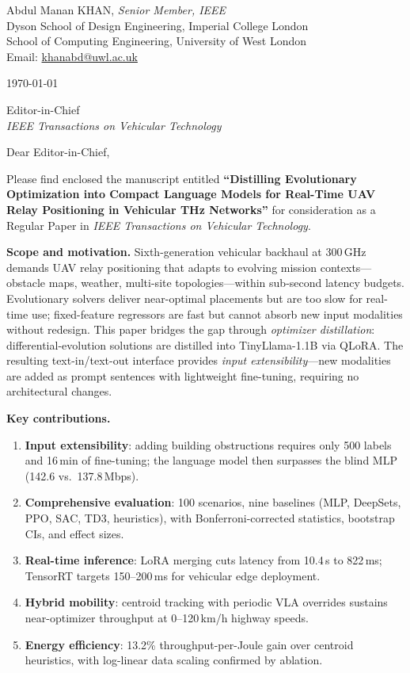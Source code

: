 \documentclass[11pt]{article}
\begin{document}
\noindent
Abdul Manan KHAN, \textit{Senior Member, IEEE}\\
Dyson School of Design Engineering, Imperial College London\\
School of Computing Engineering, University of West London\\
Email: \href{mailto:khanabd@uwl.ac.uk}{khanabd@uwl.ac.uk}

\bigskip
\noindent
\today

\bigskip
\noindent
Editor-in-Chief\\
\textit{IEEE Transactions on Vehicular Technology}

\bigskip
\noindent
Dear Editor-in-Chief,

\medskip
\noindent
Please find enclosed the manuscript entitled \textbf{``Distilling Evolutionary Optimization into Compact Language Models for Real-Time UAV Relay Positioning in Vehicular THz Networks''} for consideration as a Regular Paper in \textit{IEEE Transactions on Vehicular Technology}.

\medskip
\noindent\textbf{Scope and motivation.}
Sixth-generation vehicular backhaul at 300\,GHz demands UAV relay positioning that adapts to evolving mission contexts---obstacle maps, weather, multi-site topologies---within sub-second latency budgets. Evolutionary solvers deliver near-optimal placements but are too slow for real-time use; fixed-feature regressors are fast but cannot absorb new input modalities without redesign. This paper bridges the gap through \emph{optimizer distillation}: differential-evolution solutions are distilled into TinyLlama-1.1B via QLoRA. The resulting text-in/text-out interface provides \emph{input extensibility}---new modalities are added as prompt sentences with lightweight fine-tuning, requiring no architectural changes.

\medskip
\noindent\textbf{Key contributions.}
\begin{enumerate}[nosep,leftmargin=*]
    \item \textbf{Input extensibility}: adding building obstructions requires only 500 labels and 16\,min of fine-tuning; the language model then surpasses the blind MLP (142.6 vs.\ 137.8\,Mbps).
    \item \textbf{Comprehensive evaluation}: 100 scenarios, nine baselines (MLP, DeepSets, PPO, SAC, TD3, heuristics), with Bonferroni-corrected statistics, bootstrap CIs, and effect sizes.
    \item \textbf{Real-time inference}: LoRA merging cuts latency from 10.4\,s to 822\,ms; TensorRT targets 150--200\,ms for vehicular edge deployment.
    \item \textbf{Hybrid mobility}: centroid tracking with periodic VLA overrides sustains near-optimizer throughput at 0--120\,km/h highway speeds.
    \item \textbf{Energy efficiency}: 13.2\% throughput-per-Joule gain over centroid heuristics, with log-linear data scaling confirmed by ablation.
\end{enumerate}
\end{document}
